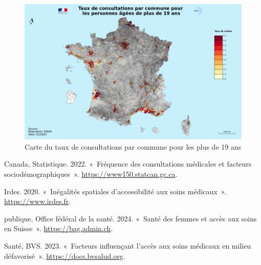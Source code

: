 \documentclass[
]{article}
\newlength{\cslhangindent}
\newenvironment{CSLReferences}[2] %
 {\begin{list}{}{%
  \setlength{\itemindent}{0pt}
  \setlength{\leftmargin}{0pt}
  \setlength{\parsep}{0pt}
  \ifodd #1
   \setlength{\leftmargin}{\cslhangindent}
   \setlength{\itemindent}{-1\cslhangindent}
  \fi
  \setlength{\itemsep}{#2\baselineskip}}}
 {\end{list}}
\begin{document}
\begin{figure}
    \centering
    \includegraphics[width=1\linewidth]{../cartes/taux_de_consultations_plus_19_ans}
    \caption{Carte du taux de consultations par commune pour les plus de 19 ans}
    \label{fig:figure}
\end{figure}

\label{refs}
\begin{CSLReferences}{1}{0}
Canada, Statistique. 2022. {«~Fréquence des consultations médicales et
facteurs sociodémographiques~»}. \url{https://www150.statcan.gc.ca}.

Irdes. 2020. {«~Inégalités spatiales d'accessibilité aux soins
médicaux~»}. \url{https://www.irdes.fr}.

publique, Office fédéral de la santé. 2024. {«~Santé des femmes et accès
aux soins en Suisse~»}. \url{https://bag.admin.ch}.

Santé, BVS. 2023. {«~Facteurs influençant l'accès aux soins médicaux en
milieu défavorisé~»}. \url{https://docs.bvsalud.org}.

\end{CSLReferences}
\end{document}

